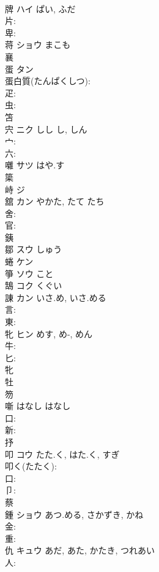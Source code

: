 \documentclass[8pt]{extreport}
\begin{document}
\begin{CJK}{UTF8}{min}
\\	牌	ハイ	ぱい, ふだ		
\\	片: 
\\	卑: 
\\	蒋	ショウ まこも			
\\	襄						
\\	蛋	タン			
\\	蛋白質(たんぱくしつ): 
\\	疋: 
\\	虫: 
\\	笘						
\\	宍	ニク	しし	し, しん	
\\	宀: 
\\	六: 
\\	囃	サツ はや.す			
\\	簗						
\\	峙	ジ			
\\	舘	カン	やかた, たて	たち	
\\	舍: 
\\	官: 
\\	銕						
\\	鄒	スウ しゅう			
\\	蜷	ケン			
\\	箏	ソウ こと			
\\	鵠	コク くぐい			
\\	諌	カン	いさ.め, いさ.める		
\\	言: 
\\	東: 
\\	牝	ヒン	めす, め-, めん		
\\	牛: 
\\	匕: 
\\	牝 
\\	牡 
\\	笏						
\\	噺	はなし	はなし		
\\	口: 
\\	新: 
\\	抒						
\\	叩	コウ	たた.く, はた.く, すぎ		
\\	叩く(たたく): 
\\	口: 
\\	卩: 
\\	蔡						
\\	鍾	ショウ	あつ.める, さかずき, かね		
\\	金: 
\\	重: 
\\	仇	キュウ	あだ, あた, かたき, つれあい		
\\	人: 

\end{CJK}
\end{document}
